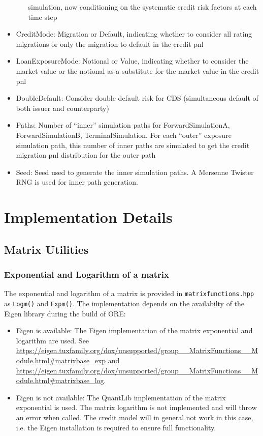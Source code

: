 \documentclass[12pt, a4paper]{article}
\begin{document}
\begin{itemize}
\begin{itemize}
    simulation, now conditioning on the systematic credit risk factors at each time step
  \end{itemize}
\item CreditMode: Migration or Default, indicating whether to consider all rating migrations or only the migration to default in the credit pnl
\item LoanExposureMode: Notional or Value, indicating whether to consider the market value or the notional as a substitute for the market value in the credit pnl
\item DoubleDefault: Consider double default risk for CDS (simultaneous default of both issuer and counterparty)
\item Paths: Number of ``inner'' simulation paths for ForwardSimulationA, ForwardSimulationB, TerminalSimulation. For
    each ``outer'' exposure simulation path, this number of inner paths are simulated to get the credit migration pnl
    distribution for the outer path
\item Seed: Seed used to generate the inner simulation paths. A Mersenne Twister RNG is used for inner path generation.  
\end{itemize}

\section{Implementation Details}

\subsection{Matrix Utilities}

\subsubsection{Exponential and Logarithm of a matrix}

The exponential and logarithm of a matrix is provided in \verb+matrixfunctions.hpp+ as \verb+Logm()+ and \verb+Expm()+. The implementation depends on the availabilty of the Eigen library \cite{Eigen} during the build of ORE:

\begin{itemize}
\item Eigen is available: The Eigen implementation of the matrix exponential and logarithm are used. See \url{https://eigen.tuxfamily.org/dox/unsupported/group__MatrixFunctions__Module.html#matrixbase_exp} and \url{https://eigen.tuxfamily.org/dox/unsupported/group__MatrixFunctions__Module.html#matrixbase_log}.
\item Eigen is not available: The QuantLib implementation of the matrix exponential is used. The matrix logarithm is not implemented and will throw an error when called. The credit model will in general not work in this case, i.e. the Eigen installation is required to ensure full functionality.
\end{itemize}
\end{document}
